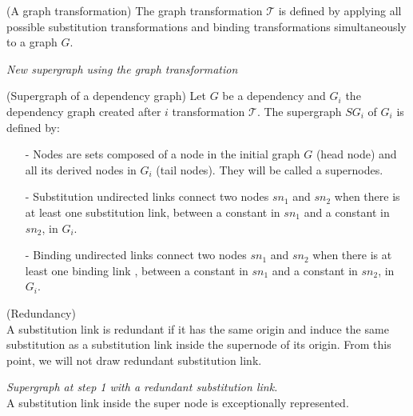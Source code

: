 \begin{mydef} (A graph transformation)
The graph transformation $\mathcal{T}$ is defined by applying all possible substitution transformations and binding transformations simultaneously to a graph $G$. 
\end{mydef}

\noindent \textit{New supergraph using the graph transformation}
\begin{center}  
\end{center}

\begin{mydef} (Supergraph of a dependency graph)
Let $G$ be a dependency and $G_i$ the dependency graph created after $i$ transformation $\mathcal{T}$. The supergraph $SG_i$ of $G_i$ is defined by:
\begin{enumerate}
  \item [-] Nodes are sets composed of a node in the initial graph $G$ (head node) and all its derived nodes in $G_i$ (tail nodes). They will be called a supernodes.
  \item [-] {\color{blue}Substitution} undirected links connect two nodes $sn_1$ and $sn_2$ when there is at least one  {\color{blue}substitution} link, between a constant in $sn_1$ and a constant in $sn_2$, in $G_i$.
  \item [-] {\color{green}Binding} undirected links connect two nodes $sn_1$ and $sn_2$ when there is at least one {\color{green}binding} link , between a constant in $sn_1$ and a constant in $sn_2$, in $G_i$.
\end{enumerate}    
\end{mydef}

\begin{mydef} (Redundancy)
\\A substitution link is redundant if it has the same origin and induce the same substitution as a substitution link inside the supernode of its origin. From this point, we will not draw redundant substitution link.
\end{mydef}
\noindent \textit{Supergraph at step 1 with a redundant substitution link.}
\\A substitution link inside the super node is exceptionally represented.

